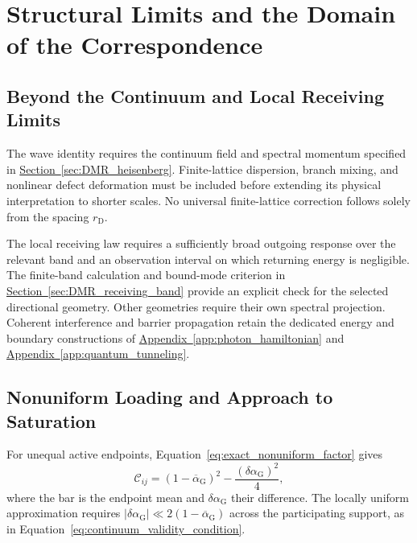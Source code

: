 \section{Structural Limits and the Domain of the Correspondence}
\label{sec:DMR_structural_limits}

\subsection{Beyond the Continuum and Local Receiving Limits}

The wave identity requires the continuum field and spectral momentum specified in \hyperref[sec:DMR_heisenberg]{Section~\ref*{sec:DMR_heisenberg}}. Finite-lattice dispersion, branch mixing, and nonlinear defect deformation must be included before extending its physical interpretation to shorter scales. No universal finite-lattice correction follows solely from the spacing $r_{\mathrm D}$.

The local receiving law requires a sufficiently broad outgoing response over the relevant band and an observation interval on which returning energy is negligible. The finite-band calculation and bound-mode criterion in \hyperref[sec:DMR_receiving_band]{Section~\ref*{sec:DMR_receiving_band}} provide an explicit check for the selected directional geometry. Other geometries require their own spectral projection. Coherent interference and barrier propagation retain the dedicated energy and boundary constructions of \hyperref[app:photon_hamiltonian]{Appendix~\ref*{app:photon_hamiltonian}} and \hyperref[app:quantum_tunneling]{Appendix~\ref*{app:quantum_tunneling}}.

\subsection{Nonuniform Loading and Approach to Saturation}

For unequal active endpoints, Equation~\eqref{eq:exact_nonuniform_factor} gives
\begin{equation}
 \mathcal C_{ij}=(1-\overline\alpha_{\mathrm G})^2
 -\frac{(\delta\alpha_{\mathrm G})^2}{4},
\end{equation}
where the bar is the endpoint mean and $\delta\alpha_{\mathrm G}$ their difference. The locally uniform approximation requires
$|\delta\alpha_{\mathrm G}|\ll2(1-\overline\alpha_{\mathrm G})$ across the participating support, as in Equation~\eqref{eq:continuum_validity_condition}.

